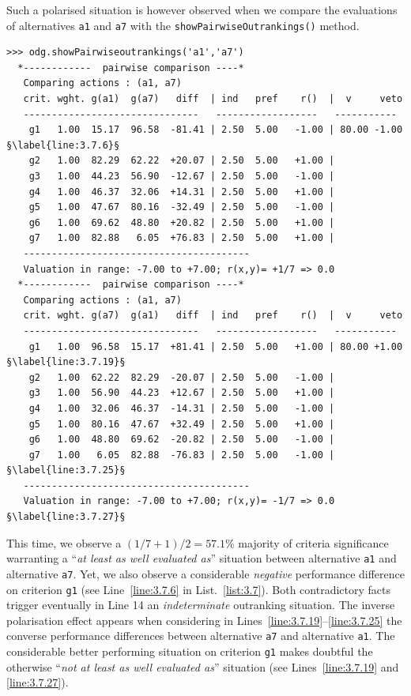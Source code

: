 Such a polarised situation is however observed when we compare the evaluations of alternatives \texttt{a1} and \texttt{a7} with the \texttt{showPairwiseOutrankings()} method. 
\begin{lstlisting}[caption={Pairwise comparison with considerable performance difference},label=list:3.7,basicstyle=\ttfamily\scriptsize]
>>> odg.showPairwiseoutrankings('a1','a7')
  *------------  pairwise comparison ----*
   Comparing actions : (a1, a7)
   crit. wght. g(a1)  g(a7)   diff  | ind   pref    r()  |  v     veto
   -------------------------------   ------------------   -----------
    g1   1.00  15.17  96.58  -81.41 | 2.50  5.00   -1.00 | 80.00 -1.00 §\label{line:3.7.6}§
    g2   1.00  82.29  62.22  +20.07 | 2.50  5.00   +1.00 | 
    g3   1.00  44.23  56.90  -12.67 | 2.50  5.00   -1.00 | 
    g4   1.00  46.37  32.06  +14.31 | 2.50  5.00   +1.00 | 
    g5   1.00  47.67  80.16  -32.49 | 2.50  5.00   -1.00 | 
    g6   1.00  69.62  48.80  +20.82 | 2.50  5.00   +1.00 | 
    g7   1.00  82.88   6.05  +76.83 | 2.50  5.00   +1.00 | 
   ----------------------------------------
   Valuation in range: -7.00 to +7.00; r(x,y)= +1/7 => 0.0
  *------------  pairwise comparison ----*
   Comparing actions : (a1, a7)
   crit. wght. g(a7)  g(a1)   diff  | ind   pref    r()  |  v     veto
   -------------------------------   ------------------   -----------
    g1   1.00  96.58  15.17  +81.41 | 2.50  5.00   +1.00 | 80.00 +1.00 §\label{line:3.7.19}§
    g2   1.00  62.22  82.29  -20.07 | 2.50  5.00   -1.00 | 
    g3   1.00  56.90  44.23  +12.67 | 2.50  5.00   +1.00 | 
    g4   1.00  32.06  46.37  -14.31 | 2.50  5.00   -1.00 | 
    g5   1.00  80.16  47.67  +32.49 | 2.50  5.00   +1.00 | 
    g6   1.00  48.80  69.62  -20.82 | 2.50  5.00   -1.00 | 
    g7   1.00   6.05  82.88  -76.83 | 2.50  5.00   -1.00 | §\label{line:3.7.25}§
   ----------------------------------------
   Valuation in range: -7.00 to +7.00; r(x,y)= -1/7 => 0.0 §\label{line:3.7.27}§
\end{lstlisting}

This time, we observe a $(1/7 + 1)/2 = 57.1\%$ majority of criteria significance warranting a ``\emph{at least as well evaluated as}'' situation between alternative \texttt{a1} and alternative \texttt{a7}. Yet, we also observe a considerable \emph{negative} performance difference on criterion \texttt{g1} (see Line~\ref{line:3.7.6} in List.~\vref{list:3.7}). Both contradictory facts trigger eventually in Line 14 an \emph{indeterminate} outranking situation. The inverse polarisation effect appears when considering in Lines~\ref{line:3.7.19}--\ref{line:3.7.25} the converse performance differences between alternative \texttt{a7} and alternative \texttt{a1}. The considerable better performing situation on criterion \texttt{g1} makes doubtful the otherwise ``\emph{not at least as well evaluated as}'' situation (see Lines~\ref{line:3.7.19} and \ref{line:3.7.27}).

